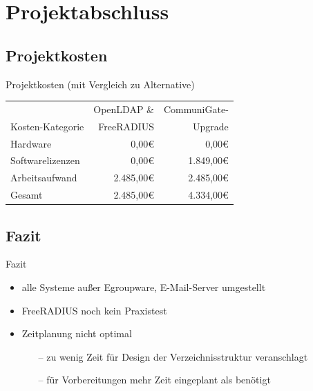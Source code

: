\documentclass[presentation,svgnames,12pt]{beamer}
\begin{document}
\section{Projektabschluss}
\subsection{Projektkosten}
\begin{frame}{Projektkosten (mit Vergleich zu Alternative)}
\begin{table}
\centering
	\begin{tabularx}{0.9\textwidth}{|X|r|r|}
		\hline
		 	&	OpenLDAP \& &	CommuniGate-\\
		Kosten-Kategorie	&	FreeRADIUS &	Upgrade\\
		\hline
		Hardware &	0,00\euro{} &	0,00\euro{}\\
		\hline
		Softwarelizenzen &	0,00\euro{} &	1.849,00\euro{}\\
		\hline
		Arbeitsaufwand &	2.485,00\euro{} &	2.485,00\euro{}\\
		\hhline{|=|=|=|}
		Gesamt &	2.485,00\euro{} &	4.334,00\euro{}\\
		\hline
	\end{tabularx}
\end{table}
\end{frame}

\subsection{Fazit}
\begin{frame}{Fazit}
\begin{itemize}
	\item alle Systeme außer Egroupware, E-Mail-Server umgestellt
	\item FreeRADIUS noch kein Praxistest
	\item Zeitplanung nicht optimal
	\vspace{6pt}
	\begin{itemize}
		\item[--] zu wenig Zeit für Design der Verzeichnisstruktur veranschlagt
		\item[--] für Vorbereitungen mehr Zeit eingeplant als benötigt
	\end{itemize}
\end{itemize}
\end{frame}
\end{document}
